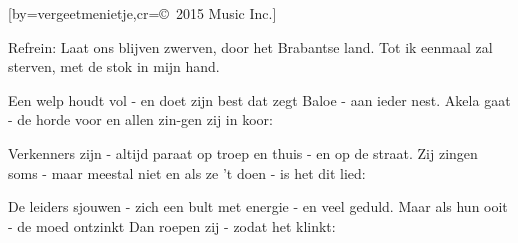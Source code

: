  

[by=vergeetmenietje,cr={\copyright~2015 Music Inc.}]




\beginverse
Refrein:
Laat ons blijven zwerven,
door het Brabantse land.
Tot ik eenmaal zal sterven,
met de stok in mijn hand.
\endverse

\beginverse
Een welp houdt vol - en doet zijn best
dat zegt Baloe - aan ieder nest.
Akela gaat - de horde voor
en allen zin-gen zij in koor:
\endverse

\beginverse
Verkenners zijn - altijd paraat
op troep en thuis - en op de straat.
Zij zingen soms - maar meestal niet
en als ze 't doen - is het dit lied:
\endverse

\beginverse
De leiders sjouwen - zich een bult
met energie - en veel geduld.
Maar als hun ooit - de moed ontzinkt
Dan roepen zij - zodat het klinkt:
\endverse




\endsong
